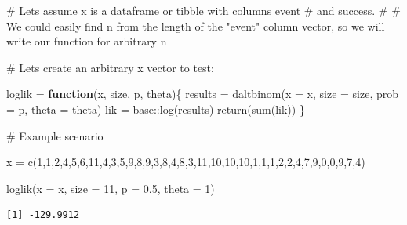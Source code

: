 \documentclass[
]{article}
\newenvironment{Shaded}{\begin{snugshade}}{\end{snugshade}}
\newcommand{\AttributeTok}[1]{\textcolor[rgb]{0.40,0.45,0.13}{#1}}
\newcommand{\CommentTok}[1]{\textcolor[rgb]{0.37,0.37,0.37}{#1}}
\newcommand{\ControlFlowTok}[1]{\textcolor[rgb]{0.00,0.23,0.31}{\textbf{#1}}}
\newcommand{\DecValTok}[1]{\textcolor[rgb]{0.68,0.00,0.00}{#1}}
\newcommand{\FloatTok}[1]{\textcolor[rgb]{0.68,0.00,0.00}{#1}}
\newcommand{\FunctionTok}[1]{\textcolor[rgb]{0.28,0.35,0.67}{#1}}
\newcommand{\NormalTok}[1]{\textcolor[rgb]{0.00,0.23,0.31}{#1}}
\newcommand{\OtherTok}[1]{\textcolor[rgb]{0.00,0.23,0.31}{#1}}
\newcommand{\SpecialCharTok}[1]{\textcolor[rgb]{0.37,0.37,0.37}{#1}}
\begin{document}
\begin{Shaded}
\begin{Highlighting}[numbers=left,,]
\CommentTok{\# Let\textquotesingle{}s assume x is a dataframe or tibble with columns event \# and success. }
\CommentTok{\# }
\CommentTok{\# We could easily find n from the length of the "event" column vector, so we will write our function for arbitrary n}


\CommentTok{\# Let\textquotesingle{}s create an arbitrary x vector to test:}


\NormalTok{loglik }\OtherTok{=} \ControlFlowTok{function}\NormalTok{(x, size, p, theta)\{}
\NormalTok{   results }\OtherTok{=} \FunctionTok{daltbinom}\NormalTok{(}\AttributeTok{x =}\NormalTok{ x, }\AttributeTok{size =}\NormalTok{ size, }\AttributeTok{prob =}\NormalTok{ p, }\AttributeTok{theta =}\NormalTok{ theta)}
\NormalTok{   lik }\OtherTok{=}\NormalTok{ base}\SpecialCharTok{::}\FunctionTok{log}\NormalTok{(results)}
   \FunctionTok{return}\NormalTok{(}\FunctionTok{sum}\NormalTok{(lik))}
\NormalTok{  \}}

\CommentTok{\# Example scenario}

\NormalTok{x }\OtherTok{=} \FunctionTok{c}\NormalTok{(}\DecValTok{1}\NormalTok{,}\DecValTok{1}\NormalTok{,}\DecValTok{2}\NormalTok{,}\DecValTok{4}\NormalTok{,}\DecValTok{5}\NormalTok{,}\DecValTok{6}\NormalTok{,}\DecValTok{11}\NormalTok{,}\DecValTok{4}\NormalTok{,}\DecValTok{3}\NormalTok{,}\DecValTok{5}\NormalTok{,}\DecValTok{9}\NormalTok{,}\DecValTok{8}\NormalTok{,}\DecValTok{9}\NormalTok{,}\DecValTok{3}\NormalTok{,}\DecValTok{8}\NormalTok{,}\DecValTok{4}\NormalTok{,}\DecValTok{8}\NormalTok{,}\DecValTok{3}\NormalTok{,}\DecValTok{11}\NormalTok{,}\DecValTok{10}\NormalTok{,}\DecValTok{10}\NormalTok{,}\DecValTok{10}\NormalTok{,}\DecValTok{1}\NormalTok{,}\DecValTok{1}\NormalTok{,}\DecValTok{1}\NormalTok{,}\DecValTok{2}\NormalTok{,}\DecValTok{2}\NormalTok{,}\DecValTok{4}\NormalTok{,}\DecValTok{7}\NormalTok{,}\DecValTok{9}\NormalTok{,}\DecValTok{0}\NormalTok{,}\DecValTok{0}\NormalTok{,}\DecValTok{9}\NormalTok{,}\DecValTok{7}\NormalTok{,}\DecValTok{4}\NormalTok{)}

\FunctionTok{loglik}\NormalTok{(}\AttributeTok{x =}\NormalTok{ x, }\AttributeTok{size =} \DecValTok{11}\NormalTok{, }\AttributeTok{p =} \FloatTok{0.5}\NormalTok{, }\AttributeTok{theta =} \DecValTok{1}\NormalTok{)}
\end{Highlighting}
\end{Shaded}

\begin{verbatim}
[1] -129.9912
\end{verbatim}
\end{document}
